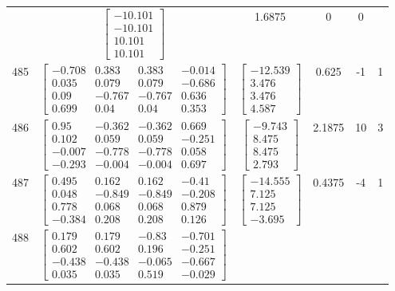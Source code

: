 \documentclass[a4paper,12pt]{article}
\begin{document}
\begin{tabular}{c c c c c c}
&
$\begin{bmatrix} -10.101 \\ -10.101 \\ 10.101 \\ 10.101 \end{bmatrix}$
&
1.6875
&
0
&
0
\\
485
&
$\begin{bmatrix} -0.708 & 0.383 & 0.383 & -0.014 \\ 0.035 & 0.079 & 0.079 & -0.686 \\ 0.09 & -0.767 & -0.767 & 0.636 \\ 0.699 & 0.04 & 0.04 & 0.353 \end{bmatrix}$
&
$\begin{bmatrix} -12.539 \\ 3.476 \\ 3.476 \\ 4.587 \end{bmatrix}$
&
0.625
&
-1
&
1
\\
486
&
$\begin{bmatrix} 0.95 & -0.362 & -0.362 & 0.669 \\ 0.102 & 0.059 & 0.059 & -0.251 \\ -0.007 & -0.778 & -0.778 & 0.058 \\ -0.293 & -0.004 & -0.004 & 0.697 \end{bmatrix}$
&
$\begin{bmatrix} -9.743 \\ 8.475 \\ 8.475 \\ 2.793 \end{bmatrix}$
&
2.1875
&
10
&
3
\\
487
&
$\begin{bmatrix} 0.495 & 0.162 & 0.162 & -0.41 \\ 0.048 & -0.849 & -0.849 & -0.208 \\ 0.778 & 0.068 & 0.068 & 0.879 \\ -0.384 & 0.208 & 0.208 & 0.126 \end{bmatrix}$
&
$\begin{bmatrix} -14.555 \\ 7.125 \\ 7.125 \\ -3.695 \end{bmatrix}$
&
0.4375
&
-4
&
1
\\
488
&
$\begin{bmatrix} 0.179 & 0.179 & -0.83 & -0.701 \\ 0.602 & 0.602 & 0.196 & -0.251 \\ -0.438 & -0.438 & -0.065 & -0.667 \\ 0.035 & 0.035 & 0.519 & -0.029 \end{bmatrix}$

\end{tabular}
\end{document}

